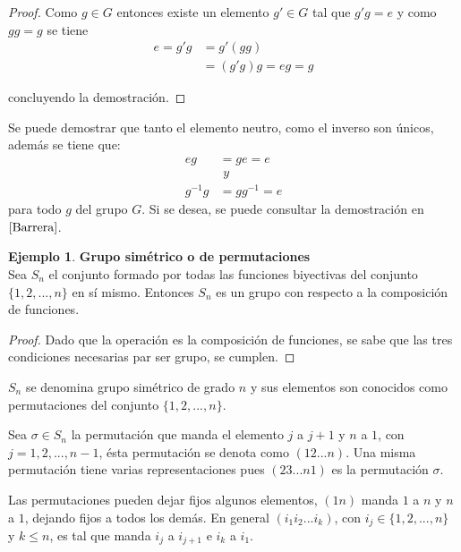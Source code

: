 \documentclass[12pt]{book}
\theoremstyle{definition}
\newtheorem{example}{Ejemplo}
\begin{document}
\begin{proof}
 Como $g\in G$ entonces existe un elemento $g'\in G$ tal
que $g'g=e$ y como $gg=g$ se tiene
\begin{equation*}
  \begin{split}
    e=g'g&=g'(gg)\\
    &=(g'g)g=eg=g
  \end{split}
\end{equation*}

concluyendo la demostración.
\end{proof}

Se puede demostrar que tanto el elemento neutro, como el inverso son
únicos, además se tiene que:
\begin{equation*}
\begin{split}
eg&=ge=e\\ 
& \textit{    y   }\\
 g^{-1}g&=gg^{-1}=e
\end{split}
\end{equation*}
para todo  $g$ del grupo $G$. Si se desea, se puede consultar la demostración
en $\cite{Barrera}$.

\begin{example}\textbf{Grupo simétrico o de
    permutaciones}\\
  Sea $S_n$ el conjunto formado por todas las funciones
  biyectivas del conjunto $\{1,2,...,n \}$ en sí mismo. Entonces $S_n$ es un
  grupo con respecto a la composición de funciones.


\begin{proof}

Dado que la operación es la composición de funciones, se sabe que las
tres condiciones necesarias par ser grupo, se cumplen. 
\end{proof}

  $S_n$ se denomina grupo simétrico de grado $n$ y sus elementos son
  conocidos como permutaciones del conjunto $\{1,2,...,n\}$.
\end{example}

Sea $\sigma \in S_n$ la permutación que manda el elemento $j$ a $j+1$
y $n$ a $1$, con $j=1,2,...,n-1$, ésta permutación se denota como
$(12...n)$. Una misma permutación tiene varias representaciones pues
$(23...n1)$ es la permutación $\sigma$.

Las permutaciones pueden dejar fijos algunos elementos, $(1n)$ manda
$1$ a $n$ y $n$ a $1$, dejando fijos a todos los demás. En general
$(i_1i_2...i_k)$, con $i_j\in \{ 1,2,...,n\}$ y $k\le n$, es tal que
manda $i_j$ a $i_{j+1}$ e $i_k$ a $i_1$.
\end{document}
